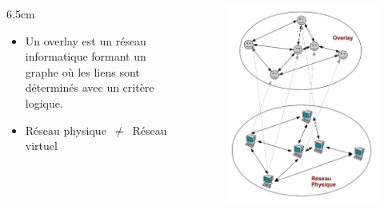 \documentclass{beamer}
\begin{document}
  \begin{frame}
	
 	\begin{columns}
          \begin{column}{6,5cm}
	    	\begin{itemize}
		\item Un overlay est un réseau informatique formant un graphe où les liens sont déterminés avec un critère logique.\\
		\item Réseau physique~$\neq$~Réseau virtuel
		\end{itemize}
	  \end{column}
          \begin{column}{5cm}
        	\begin{figure}
        	  \includegraphics[scale=0.1]{./Ressources/Images/overlay.png}\\
        	  \label{Propa_Algo}
        	\end{figure}
          \end{column}
        \end{columns}
	
  \end{frame}
\end{document}
